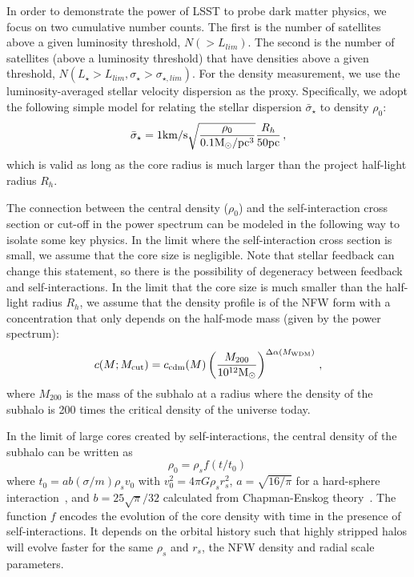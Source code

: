 \documentclass[modern,linenumbers]{aastex62}
\begin{document}
In order to demonstrate the power of LSST to probe dark matter physics, we focus on two cumulative number counts. The first is the number of satellites above a given luminosity threshold, $N(>L_{lim})$. The second is the number of satellites (above a luminosity threshold) that have densities above a given threshold, $N(L_\star>L_{lim}, \sigma_\star> \sigma_{\star,lim})$. For the density measurement, we use the luminosity-averaged stellar velocity dispersion as the proxy. Specifically, we adopt the following simple model for relating the stellar dispersion $\bar{\sigma}_\star$ to density $\rho_0$:
\begin{equation}
\bar{\sigma}_\star = 1 {\rm km}/{\rm s} \sqrt{\frac{\rho_0}{0.1 {\rm M}_\odot/{\rm pc}^3}} \frac{R_h}{50 {\rm pc}}\,,
\end{equation}
which is valid as long as the core radius is much larger than the project half-light radius $R_h$. 

The connection between the central density ($\rho_0$) and the self-interaction cross section or cut-off in the power spectrum can be modeled in the following way to isolate some key physics. In the limit where the self-interaction cross section is small, we assume that the core size is negligible. Note that stellar feedback can change this statement, so there is the possibility of degeneracy between feedback and self-interactions. In the limit that the core size is much smaller than the half-light radius $R_h$, we assume that the density profile is of the NFW form with a concentration that only depends on the half-mode mass (given by the power spectrum):
\begin{equation}
c(M;M_{\rm cut}) = c_{\rm cdm}(M)\left(\frac{M_{200}}{10^{12}{\rm M}_\odot}\right)^{\Delta\alpha(M_{\rm WDM})}\,,
\end{equation}
where $M_{200}$ is the mass of the subhalo at a radius where the density of the subhalo is 200 times the critical density of the universe today. 

In the limit of large cores created by self-interactions, the central density of the subhalo can be written as
\begin{equation}
\rho_0=\rho_s f(t/t_0)\,
\end{equation}
where $t_0 = ab(\sigma/m)\rho_s v_0$ with $v_0^2=4\pi G \rho_s r_s^2$, $a=\sqrt{16/\pi}$ for a hard-sphere interaction~\citep{Balberg:2002ue}, and $b=25\sqrt{\pi}/32$ calculated from Chapman-Enskog theory~\citep{1970mtnu.book.....C}. The function $f$ encodes the evolution of the core density with time in the presence of self-interactions. It depends on the orbital history such that highly stripped halos will evolve faster for the same $\rho_s$ and $r_s$, the NFW density and radial scale parameters. 
\end{document}
